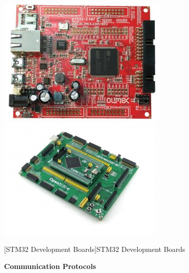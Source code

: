 \documentclass[%
xelatex,
	oneside,		%
	12pt,			%
	parskip=half,	%
	abstracton,
	chapterprefix=true%
    appendixprefix=true]
{scrbook}
\begin{document}
\begin{center}
\includegraphics[scale=0.5]{fig/STM32-E407.jpg}\hspace*{1cm}
\includegraphics[scale=0.6]{fig/Open407I-C.jpg}


[STM32 Development Boards]{STM32 Development Boards\cite{olimex}\cite{waveshare}}
\label{fig:stm32}
\end{center}
\vspace*{0.5cm}	

{\bfseries Communication Protocols}
	
\end{document}
